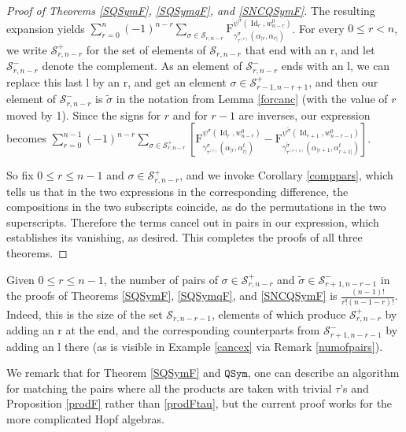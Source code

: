 \documentclass{article}
\theoremstyle{definition}
\begin{document}
\begin{proof}[Proof of Theorems \ref{SQSymF}, \ref{SQSymqF}, and \ref{SNCQSymF}]
The resulting expansion yields $\sum_{r=0}^{n}(-1)^{n-r}\sum_{\sigma\in\mathcal{S}_{r,n-r}}\mathrm{F}_{\gamma^{\sigma}_{\tau^{(r)}}(\alpha_{|r},\alpha_{r|})}^{\psi^{\sigma}(\operatorname{Id}_{r},w^{0}_{n-r})}$. For every $0 \leq r<n$, we write $\mathcal{S}_{r,n-r}^{+}$ for the set of elements of $\mathcal{S}_{r,n-r}$ that end with an r, and let $\mathcal{S}_{r,n-r}^{-}$ denote the complement. As an element of $\mathcal{S}_{r,n-r}^{-}$ ends with an l, we can replace this last l by an r, and get an element $\sigma\in\mathcal{S}_{r-1,n-r+1}^{+}$, and then our element of $\mathcal{S}_{r,n-r}^{-}$ is $\tilde{\sigma}$ in the notation from Lemma \ref{forcanc} (with the value of $r$ moved by 1). Since the signs for $r$ and for $r-1$ are inverses, our expression becomes $\sum_{r=0}^{n-1}(-1)^{n-r}\sum_{\sigma\in\mathcal{S}_{r,n-r}^{+}}[\mathrm{F}_{\gamma^{\sigma}_{\tau^{(r)}}(\alpha_{|r},\alpha_{r|}^{t})}^{\psi^{\sigma}(\operatorname{Id}_{r},w^{0}_{n-r})}- \mathrm{F}_{\gamma^{\tilde{\sigma}}_{\tau^{(r+1)}}(\alpha_{|r+1},\alpha_{r+1|}^{t})}^{\psi^{\tilde{\sigma}}(\operatorname{Id}_{r+1},w^{0}_{n-r-1})}]$.

So fix $0 \leq r \leq n-1$ and $\sigma\in\mathcal{S}_{r,n-r}^{+}$, and we invoke Corollary \ref{comppars}, which tells us that in the two expressions in the corresponding difference, the compositions in the two subscripts coincide, as do the permutations in the two superscripts. Therefore the terms cancel out in pairs in our expression, which establishes its vanishing, as desired. This completes the proofs of all three theorems.
\end{proof}
Given $0 \leq r \leq n-1$, the number of pairs of $\sigma\in\mathcal{S}_{r,n-r}^{+}$ and $\tilde{\sigma}\in\mathcal{S}_{r+1,n-r-1}^{-}$ in the proofs of Theorems \ref{SQSymF}, \ref{SQSymqF}, and \ref{SNCQSymF} is $\frac{(n-1)!}{r!(n-1-r)!}$. Indeed, this is the size of the set $\mathcal{S}_{r,n-r-1}$, elements of which produce $\mathcal{S}_{r,n-r}^{+}$ by adding an r at the end, and the corresponding counterparts from $\mathcal{S}_{r+1,n-r-1}^{-}$ by adding an l there (as is visible in Example \ref{cancex} via Remark \ref{numofpairs}).

We remark that for Theorem \ref{SQSymF} and $\mathtt{QSym}$, one can describe an algorithm for matching the pairs where all the products are taken with trivial $\tau$'s and Proposition \ref{prodF} rather than \ref{prodFtau}, but the current proof works for the more complicated Hopf algebras.

\medskip
\end{document}

